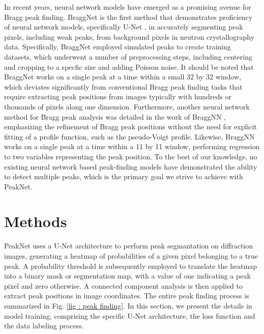 \documentclass[conference]{IEEEtran}
\newcommand{\peaknet}{PeakNet}
\begin{document}
In recent years, neural network models have emerged as a promising avenue for
Bragg peak finding.  BraggNet \citep{sullivanBraggNetIntegratingBragg2019} is
the first method that demonstrates proficiency of neural network models,
specifically U-Net \citep{ronnebergerUNetConvolutionalNetworks2015}, in
accurately segmenting peak pixels, including weak peaks, from background pixels
in neutron crystallography data.  Specifically, BraggNet employed simulated
peaks to create training datasets, which underwent a number of preprocessing
steps, including centering and cropping to a specfic size and adding Poisson
noise.  It should be noted that BraggNet works on a single peak at a time within
a small 32 by 32 window, which deviates significantly from conventional Bragg
peak finding tasks that require extracting peak positions from images typically
with hundreds or thousands of pixels along one dimension.  Furthermore, another
neural network method for Bragg peak analysis was detailed in the work of
BraggNN \citep{liuBraggNNFastXray2021}, emphasizing the refinement of Bragg peak
positions without the need for explicit fitting of a profile function, such as
the pseudo-Voigt profile.  Likewise, BraggNN works on a single peak at a time
within a 11 by 11 window, performing regression to two variables representing
the peak position.  To the best of our knowledge, no existing neural network
based peak-finding models have demonstrated the ability to detect multiple peaks,
which is the primary goal we strive to achieve with \peaknet{}.



\section{Methods}


\peaknet{} uses a U-Net architecture to perform peak segmantation on diffraction
images, generating a heatmap of probabilities of a given pixel belonging to a
true peak.  A probability threshold is subsequently employed to translate the
heatmap into a binary mask or segmentation map, with a value of one indicating a
peak pixel and zero otherwise.  A connected component analysis
\citep{weaverCentrosymmetricCrossSymmetricMatrices1985} is then applied to
extract peak positions in image coordinates.  The entire peak finding process is
summarized in Fig. \ref{fig : peak finding}.  In this section, we present the
details in model training, comprising the specific U-Net architecture, the loss
function and the data labeling process.
\end{document}
